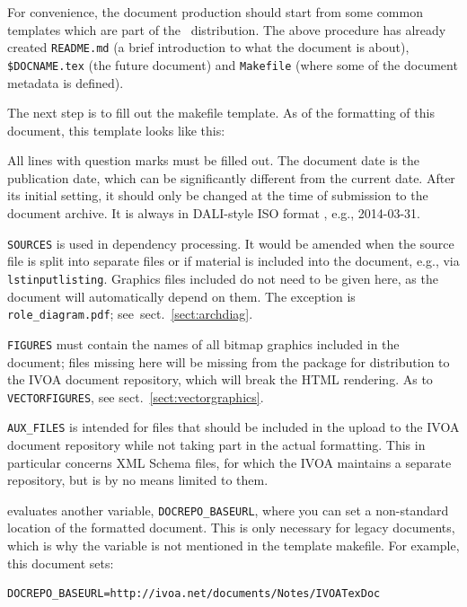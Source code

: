 \documentclass[11pt,a4paper]{ivoa}
\newcommand{\texword}[1]{\texttt{\color{texcolor} #1}}
\begin{document}
For convenience, the document production should start from some common
templates which are part of the \ivoatex\ distribution.  The above
procedure has already created \verb|README.md| (a brief introduction to
what the document is about), \verb|$DOCNAME.tex| (the future document)
and \verb|Makefile| (where some of the document metadata is defined).


The next step is to fill out the makefile template.
As of the formatting of this document, this template looks like this:



All lines with question marks must be filled out.  The document date
is the publication date, which can be significantly different from the
current date.  After its initial setting, it should only be changed at
the time of submission to the document archive.  It is always in
DALI-style ISO format \citep{2017ivoa.spec.0517D}, e.g., 2014-03-31.

\texttt{SOURCES} is used in dependency processing.  It would be amended
when the source file is split into separate files or if material is
included into the document, e.g., via \texword{lstinputlisting}.
Graphics files included do not need to be given here, as the document
will automatically depend on them.  The exception is
\verb|role_diagram.pdf|; see~sect.~\ref{sect:archdiag}.

\texttt{FIGURES} must contain the names of all bitmap graphics included
in the document; files missing here will be missing from the package for
distribution to the IVOA document repository, which will break the HTML
rendering.  As to \texttt{VECTORFIGURES}, see
sect.~\ref{sect:vectorgraphics}.

\texttt{AUX\_FILES} is intended for files that should be included in the
upload to the IVOA document repository while not taking part in the
actual formatting.  This in particular concerns XML Schema files, for
which the IVOA maintains a separate repository, but is by no means
limited to them.

\ivoatex{} evaluates another variable, \verb|DOCREPO_BASEURL|, where you
can set a non-standard location of the formatted document.  This
is only necessary for legacy documents, which is why the variable is not
mentioned in the template makefile.  For example, this document sets:
\begin{lstlisting}
DOCREPO_BASEURL=http://ivoa.net/documents/Notes/IVOATexDoc
\end{lstlisting}
\end{document}

